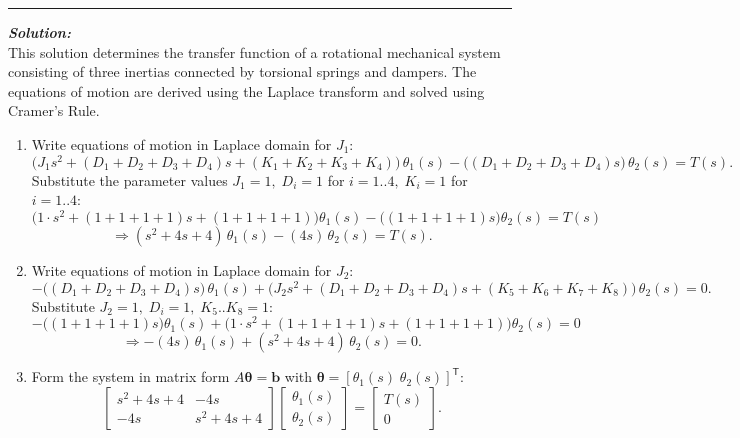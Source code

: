 \documentclass[11pt]{article}
\begin{document}
\noindent\rule{\textwidth}{1pt}

\vspace{12pt}

\noindent \textbf{\textit{Solution:}}
\\ This solution determines the transfer function of a rotational mechanical system consisting of three inertias connected by torsional springs and dampers. The equations of motion are derived using the Laplace transform and solved using Cramer's Rule.\\

\begin{enumerate}[label=(\alph*), itemindent=*, leftmargin=*, nolistsep]
     \item Write equations of motion in Laplace domain for \(J_1\):
    \[
    \big(J_1 s^2 + (D_1+D_2+D_3+D_4)s + (K_1+K_2+K_3+K_4)\big)\,\theta_1(s)
    - \big((D_1+D_2+D_3+D_4)s\big)\,\theta_2(s) = T(s).
    \]
    Substitute the parameter values \(J_1=1,\; D_i=1\) for \(i=1..4,\; K_i=1\) for \(i=1..4\):
    \[
    \big(1\cdot s^2 + (1+1+1+1)s + (1+1+1+1)\big)\theta_1(s)
    - \big((1+1+1+1)s\big)\theta_2(s) = T(s)
    \]
    \[
    \Rightarrow (s^2 + 4s + 4)\,\theta_1(s) - (4s)\,\theta_2(s) = T(s).
    \]

    \item Write equations of motion in Laplace domain for \(J_2\):
    \[
    -\big((D_1+D_2+D_3+D_4)s\big)\,\theta_1(s)
    + \big(J_2 s^2 + (D_1+D_2+D_3+D_4)s + (K_5+K_6+K_7+K_8)\big)\,\theta_2(s) = 0.
    \]
    Substitute \(J_2=1,\; D_i=1,\; K_5..K_8=1\):
    \[
    -\big((1+1+1+1)s\big)\theta_1(s) + \big(1\cdot s^2 + (1+1+1+1)s + (1+1+1+1)\big)\theta_2(s) = 0
    \]
    \[
    \Rightarrow -(4s)\,\theta_1(s) + (s^2 + 4s + 4)\,\theta_2(s) = 0.
    \]

    \item Form the system in matrix form \(A\boldsymbol{\theta}=\boldsymbol{b}\) with \(\boldsymbol{\theta}=[\theta_1(s)\;\theta_2(s)]^\mathsf{T}\):
    \[
    \begin{bmatrix}
    s^2 + 4s + 4 & -4s \\
    -4s & s^2 + 4s + 4
    \end{bmatrix}
    \begin{bmatrix}
    \theta_1(s) \\[4pt] \theta_2(s)
    \end{bmatrix}
    =
    \begin{bmatrix}
    T(s) \\[4pt] 0
    \end{bmatrix}.
    \]


\end{enumerate}
\end{document}
